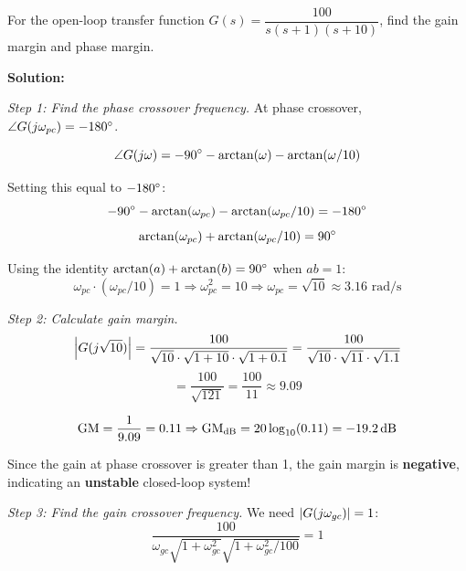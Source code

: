 \begin{examplebox}
\label{ex:margins}
For the open-loop transfer function $G(s) = \dfrac{100}{s(s+1)(s+10)}$, find the gain margin and phase margin.

\textbf{Solution:}

\textit{Step 1: Find the phase crossover frequency.}
At phase crossover, $\angle G(j\omega_{pc}) = -180^\circ$.

\begin{equation}
\angle G(j\omega) = -90^\circ - \arctan(\omega) - \arctan(\omega/10)
\end{equation}

Setting this equal to $-180^\circ$:
\begin{equation}
-90^\circ - \arctan(\omega_{pc}) - \arctan(\omega_{pc}/10) = -180^\circ
\end{equation}
\begin{equation}
\arctan(\omega_{pc}) + \arctan(\omega_{pc}/10) = 90^\circ
\end{equation}

Using the identity $\arctan(a) + \arctan(b) = 90^\circ$ when $ab = 1$:
\begin{equation}
\omega_{pc} \cdot (\omega_{pc}/10) = 1 \Rightarrow \omega_{pc}^2 = 10 \Rightarrow \omega_{pc} = \sqrt{10} \approx 3.16 \text{ rad/s}
\end{equation}

\textit{Step 2: Calculate gain margin.}
\begin{equation}
\left|G(j\sqrt{10})\right| = \frac{100}{\sqrt{10} \cdot \sqrt{1+10} \cdot \sqrt{1+0.1}} = \frac{100}{\sqrt{10} \cdot \sqrt{11} \cdot \sqrt{1.1}}
\end{equation}
\begin{equation}
= \frac{100}{\sqrt{121}} = \frac{100}{11} \approx 9.09
\end{equation}

\begin{equation}
\text{GM} = \frac{1}{9.09} = 0.11 \Rightarrow \text{GM}_{\text{dB}} = 20\log_{10}(0.11) = -19.2\,\text{dB}
\end{equation}

Since the gain at phase crossover is greater than 1, the gain margin is \textbf{negative}, indicating an \textbf{unstable} closed-loop system!

\textit{Step 3: Find the gain crossover frequency.}
We need $\left|G(j\omega_{gc})\right| = 1$:
\begin{equation}
\frac{100}{\omega_{gc}\sqrt{1+\omega_{gc}^2}\sqrt{1+\omega_{gc}^2/100}} = 1
\end{equation}


\end{examplebox}
